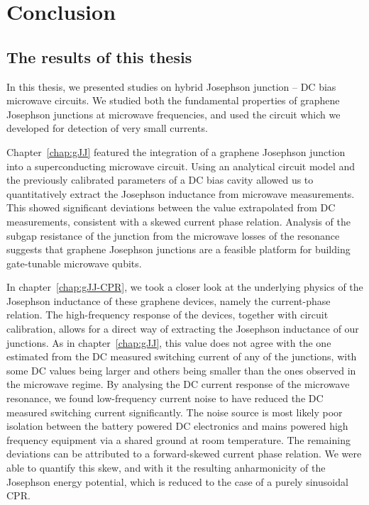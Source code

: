 \newchapstyle
\chapter{Conclusion}
\label{chap:conclusion}

\afterpage{\pagecolor{none}}\newpage

\section{The results of this thesis}
In this thesis, we presented studies on hybrid Josephson junction -- DC bias microwave circuits.
%
We studied both the fundamental properties of graphene Josephson junctions at microwave frequencies, and used the circuit which we developed for detection of very small currents.

Chapter~\ref{chap:gJJ} featured the integration of a graphene Josephson junction into a superconducting microwave circuit.
%
Using an analytical circuit model and the previously calibrated parameters of a DC bias cavity allowed us to quantitatively extract the Josephson inductance from microwave measurements.
%
This showed significant deviations between the value extrapolated from DC measurements, consistent with a skewed current phase relation.
%
Analysis of the subgap resistance of the junction from the microwave losses of the resonance suggests that graphene Josephson junctions are a feasible platform for building gate-tunable microwave qubits.

In chapter~\ref{chap:gJJ-CPR}, we took a closer look at the underlying physics of the Josephson inductance of these graphene devices, namely the current-phase relation.
%
The high-frequency response of the devices, together with circuit calibration, allows for a direct way of extracting the Josephson inductance of our junctions.
%
As in chapter~\ref{chap:gJJ}, this value does not agree with the one estimated from the DC measured switching current of any of the junctions, with some DC values being larger and others being smaller than the ones observed in the microwave regime.
%
By analysing the DC current response of the microwave resonance, we found low-frequency current noise to have reduced the DC measured switching current significantly.
%
The noise source is most likely poor isolation between the battery powered DC electronics and mains powered high frequency equipment via a shared ground at room temperature.
%
The remaining deviations can be attributed to a forward-skewed current phase relation.
%
We were able to quantify this skew, and with it the resulting anharmonicity of the Josephson energy potential, which is reduced to the case of a purely sinusoidal CPR.



